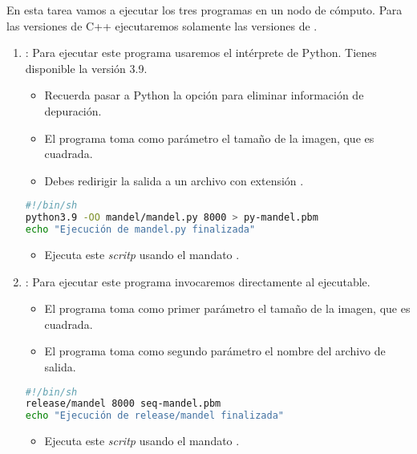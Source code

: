 En esta tarea vamos a ejecutar los tres programas en un nodo de cómputo.
Para las versiones de C++ ejecutaremos solamente las versiones de .

\begin{enumerate}
  \item {}: Para ejecutar este programa usaremos el intérprete de Python.
        Tienes disponible la versión 3.9.

    \begin{itemize}
      \item Recuerda pasar a Python la opción  para eliminar información
            de depuración.
      \item El programa toma como parámetro el tamaño de la imagen, que es cuadrada.
      \item Debes redirigir la salida a un archivo con extensión .
    \end{itemize}

\begin{lstlisting}[language=bash,title={Archivo runpy.sh},frame=single]
#!/bin/sh
python3.9 -OO mandel/mandel.py 8000 > py-mandel.pbm
echo "Ejecución de mandel.py finalizada"
\end{lstlisting}

    \begin{itemize}
      \item Ejecuta este \emph{scritp} usando el mandato .
    \end{itemize}

  \item {}: Para ejecutar este programa invocaremos directamente al
        ejecutable.
    \begin{itemize}
      \item El programa toma como primer parámetro el tamaño de la imagen, que es cuadrada.
      \item El programa toma como segundo parámetro el nombre del archivo de salida.
    \end{itemize}

\begin{lstlisting}[language=bash,title={Archivo run-seq-mandel.sh},frame=single]
#!/bin/sh
release/mandel 8000 seq-mandel.pbm
echo "Ejecución de release/mandel finalizada"
\end{lstlisting}
    \begin{itemize}
      \item Ejecuta este \emph{scritp} usando el mandato .
    \end{itemize}


\end{enumerate}
